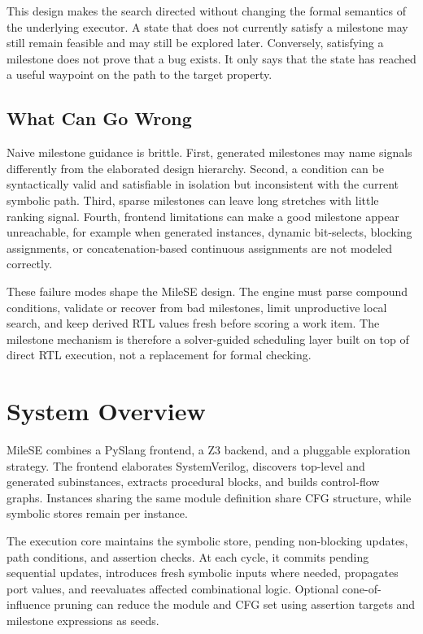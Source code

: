 \documentclass[conference]{IEEEtran}
\begin{document}
This design makes the search directed without changing the formal semantics of the underlying executor. A state that does not currently satisfy a milestone may still remain feasible and may still be explored later. Conversely, satisfying a milestone does not prove that a bug exists. It only says that the state has reached a useful waypoint on the path to the target property.

\subsection{What Can Go Wrong}
Naive milestone guidance is brittle. First, generated milestones may name signals differently from the elaborated design hierarchy. Second, a condition can be syntactically valid and satisfiable in isolation but inconsistent with the current symbolic path. Third, sparse milestones can leave long stretches with little ranking signal. Fourth, frontend limitations can make a good milestone appear unreachable, for example when generated instances, dynamic bit-selects, blocking assignments, or concatenation-based continuous assignments are not modeled correctly.

These failure modes shape the MileSE design. The engine must parse compound conditions, validate or recover from bad milestones, limit unproductive local search, and keep derived RTL values fresh before scoring a work item. The milestone mechanism is therefore a solver-guided scheduling layer built on top of direct RTL execution, not a replacement for formal checking.

\section{System Overview}
\label{sec:overview}
MileSE combines a PySlang frontend, a Z3 backend, and a pluggable exploration strategy. The frontend elaborates SystemVerilog, discovers top-level and generated subinstances, extracts procedural blocks, and builds control-flow graphs. Instances sharing the same module definition share CFG structure, while symbolic stores remain per instance.

The execution core maintains the symbolic store, pending non-blocking updates, path conditions, and assertion checks. At each cycle, it commits pending sequential updates, introduces fresh symbolic inputs where needed, propagates port values, and reevaluates affected combinational logic. Optional cone-of-influence pruning can reduce the module and CFG set using assertion targets and milestone expressions as seeds.
\end{document}
